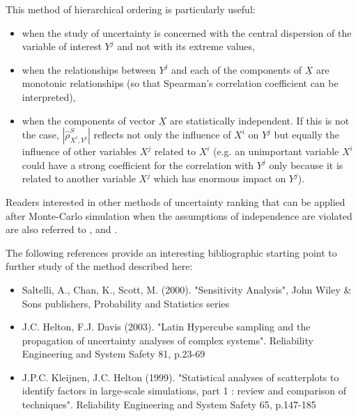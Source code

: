 {
  This method of hierarchical ordering is particularly useful:
  \begin{itemize}
  \item when the study of uncertainty is concerned with the central dispersion of the variable of interest $Y^j$ and not with its extreme values,
  \item when the relationships between $Y^j$ and each of the components of $\underline{X}$ are monotonic relationships (so that Spearman's correlation coefficient can be interpreted),
  \item when the components of vector $\underline{X}$ are statistically independent. If this is not the case, $\left| \widehat{\rho}^S_{X^i,Y^j} \right|$  reflects not only the influence of $X^i$ on $Y^j$ but equally the influence of  other variables $X^j$ related to $X^i$ (e.g. an unimportant variable $X^i$ could have a strong coefficient for the correlation with $Y^j$ only because it is related to another variable $X^j$ which has enormous impact on $Y^j$).
  \end{itemize}

  Readers interested in other methods of uncertainty ranking  that can be applied after Monte-Carlo simulation when the assumptions of independence are violated are also referred to ,  and .

  The following references provide an interesting bibliographic starting point to further study of the method described here:
  \begin{itemize}
  \item Saltelli, A., Chan, K., Scott, M. (2000). "Sensitivity Analysis", John Wiley \& Sons publishers, Probability and Statistics series
  \item J.C. Helton, F.J. Davis (2003). "Latin Hypercube sampling and the propagation of uncertainty analyses of complex systems". Reliability Engineering and System Safety 81, p.23-69
  \item J.P.C. Kleijnen, J.C. Helton (1999). "Statistical analyses of scatterplots to identify factors in large-scale simulations, part 1 : review and comparison of techniques". Reliability Engineering and System Safety 65, p.147-185
  \end{itemize}
}
